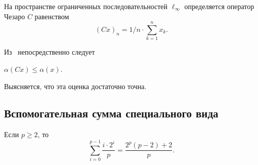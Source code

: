 \label{par:alpha_C_x}

На пространстве ограниченных последовательностей $\ell_\infty$ определяется оператор Чезаро $C$
равенством
\begin{equation}
	(Cx)_n = {1}/{n} \cdot \sum_{k=1}^n x_k
	.
\end{equation}

Из~\cite[Proposition 4]{semenov2020invariant_noncommutative} непосредственно следует
\begin{proposition}
	\label{thm:alpha_Cx_leq_alpha_x}
	$\alpha(Cx) \leqslant \alpha(x)$.
\end{proposition}
Выясняется, что эта оценка достаточно точна.

\subsection{Вспомогательная сумма специального вида}
\begin{lemma}
	Если $p\geq 2$, то
	\begin{equation}\label{summa_drobey}
		\sum_{i=0}^{p-1} \frac{i \cdot 2^i}{p} = \frac{2^p(p-2) + 2}{p}
		.
	\end{equation}
\end{lemma}


